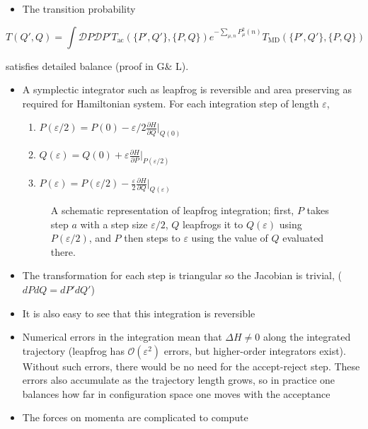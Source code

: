 \begin{itemize}
  \item The transition probability
\end{itemize}

\begin{equation}
T(Q',Q) = \int \mathcal{D}P \mathcal{D}P'T_\text{ac}(\{P',Q'\},\{P,Q\})e^{-\sum_{\mu, n} P_\mu^2(n)}T_\text{MD}(\{P',Q'\},\{P,Q\})
\end{equation}

satisfies detailed balance (proof in G\& L).
\begin{itemize}
    \item A symplectic integrator such as leapfrog is reversible and area preserving as required for Hamiltonian system. For each integration step of length $\varepsilon$,
    \begin{enumerate}
        \item $P(\varepsilon/2) = P(0) - \varepsilon/2 \frac{\partial H}{\partial Q}|_{Q(0)}$
        \item $Q(\varepsilon) = Q(0) + \varepsilon \frac{\partial H}{\partial P}|_{P(\varepsilon/2)}$
        \item $P(\varepsilon) = P(\varepsilon/2) - \frac{\varepsilon}{2}\frac{\partial H}{\partial Q}|_{Q(\varepsilon)}$
    \end{enumerate}

\begin{figure}
    \centering
    \caption{A schematic representation of leapfrog integration; first, $P$ takes step $a$ with a step size $\varepsilon/2$, $Q$ leapfrogs it to $Q(\varepsilon)$ using $P(\varepsilon/2)$, and $P$ then steps to $\varepsilon$ using the value of $Q$ evaluated there.}
    \label{fig:leapfrog}
\end{figure}

    \item The transformation for each step is triangular so the Jacobian is trivial, ($dP dQ = dP' dQ'$)
    \item It is also easy to see that this integration is reversible
    \item Numerical errors in the integration mean that $\Delta H \neq 0$ along the integrated trajectory (leapfrog has $\mathcal{O}(\varepsilon^2)$ errors, but higher-order integrators exist). Without such errors, there would be no need for the accept-reject step. These errors also accumulate as the trajectory length grows, so in practice one balances how far in configuration space one moves with the acceptance
    \item The forces on momenta are complicated to compute



\end{itemize}
